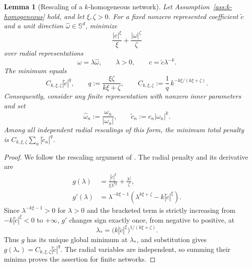\documentclass[11pt]{amsart}
\newtheorem{lemma}[theorem]{Lemma}
\theoremstyle{definition}
\theoremstyle{remark}
\begin{document}
\begin{lemma}[Rescaling of a $k$-homogeneous network]
\label{lem:homogeneous-penalty}
Let Assumption~\ref{ass:k-homogeneous} hold, and let $\xi,\zeta>0$.
For a fixed nonzero represented coefficient $\widetilde c$ and a unit direction
$\widehat\omega\in\mathbb S^d$, minimize
\begin{equation*}
	\frac{|c|^\xi}{\xi}+\frac{|\omega|^\zeta}{\zeta}
\end{equation*}
over radial representations
\begin{equation*}
	\omega=\lambda\widehat\omega,\qquad \lambda>0,\qquad
	c=\widetilde c\lambda^{-k}.
\end{equation*}
The minimum equals
\begin{equation}
\label{eq:homogeneous-induced-penalty}
	C_{k,\xi,\zeta}|\widetilde c|^q,
	\qquad
	q:=\frac{\xi\zeta}{k\xi+\zeta},
	\qquad
	C_{k,\xi,\zeta}:=
	\frac1q\,k^{-k\xi/(k\xi+\zeta)}.
\end{equation}
Consequently, consider any finite representation with nonzero inner parameters
and set
\begin{equation*}
	\widehat\omega_n:=\frac{\omega_n}{|\omega_n|},
	\qquad
	\widetilde c_n:=c_n|\omega_n|^k.
\end{equation*}
Among all independent radial rescalings of this form, the minimum total
penalty is
$C_{k,\xi,\zeta}\sum_n|\widetilde c_n|^q$.
\end{lemma}
\begin{proof}
We follow the rescaling argument of
\cite[Appendix~F, proof of Proposition~3]{pieper2022nonconvex}.
The radial penalty and its derivative are
\begin{align*}
	g(\lambda)
	&=\frac{|\widetilde c|^\xi}{\xi\lambda^{k\xi}}
	+\frac{\lambda^\zeta}{\zeta},\\
	g'(\lambda)
	&=\lambda^{-k\xi-1}
		\left(\lambda^{k\xi+\zeta}-k|\widetilde c|^\xi\right).
\end{align*}
Since $\lambda^{-k\xi-1}>0$ for $\lambda>0$ and the bracketed term is
strictly increasing from $-k|\widetilde c|^\xi<0$ to $+\infty$,
$g'$ changes sign exactly once, from negative to positive, at
\begin{equation*}
	\lambda_*=
	\bigl(k|\widetilde c|^\xi\bigr)^{1/(k\xi+\zeta)}.
\end{equation*}
Thus $g$ has its unique global minimum at $\lambda_*$, and substitution gives
$g(\lambda_*)=C_{k,\xi,\zeta}|\widetilde c|^q$.
The radial variables are independent, so summing their minima proves the
assertion for finite networks.
\end{proof}
\end{document}
